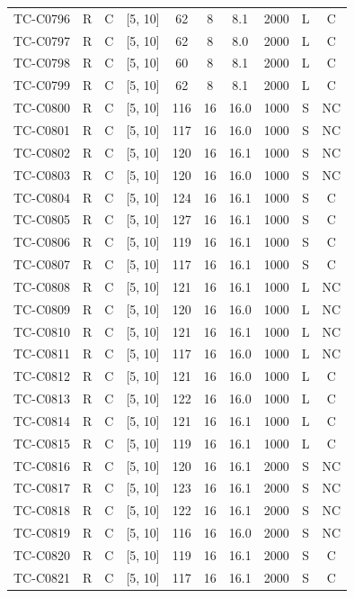 \begin{longtable}{lccccccccc}
TC-C0796 & R & C & [5, 10] & 62 & 8 & 8.1 & 2000 & L & C \\
TC-C0797 & R & C & [5, 10] & 62 & 8 & 8.0 & 2000 & L & C \\
TC-C0798 & R & C & [5, 10] & 60 & 8 & 8.1 & 2000 & L & C \\
TC-C0799 & R & C & [5, 10] & 62 & 8 & 8.1 & 2000 & L & C \\
TC-C0800 & R & C & [5, 10] & 116 & 16 & 16.0 & 1000 & S & NC \\
TC-C0801 & R & C & [5, 10] & 117 & 16 & 16.0 & 1000 & S & NC \\
TC-C0802 & R & C & [5, 10] & 120 & 16 & 16.1 & 1000 & S & NC \\
TC-C0803 & R & C & [5, 10] & 120 & 16 & 16.0 & 1000 & S & NC \\
TC-C0804 & R & C & [5, 10] & 124 & 16 & 16.1 & 1000 & S & C \\
TC-C0805 & R & C & [5, 10] & 127 & 16 & 16.1 & 1000 & S & C \\
TC-C0806 & R & C & [5, 10] & 119 & 16 & 16.1 & 1000 & S & C \\
TC-C0807 & R & C & [5, 10] & 117 & 16 & 16.1 & 1000 & S & C \\
TC-C0808 & R & C & [5, 10] & 121 & 16 & 16.1 & 1000 & L & NC \\
TC-C0809 & R & C & [5, 10] & 120 & 16 & 16.0 & 1000 & L & NC \\
TC-C0810 & R & C & [5, 10] & 121 & 16 & 16.1 & 1000 & L & NC \\
TC-C0811 & R & C & [5, 10] & 117 & 16 & 16.0 & 1000 & L & NC \\
TC-C0812 & R & C & [5, 10] & 121 & 16 & 16.0 & 1000 & L & C \\
TC-C0813 & R & C & [5, 10] & 122 & 16 & 16.0 & 1000 & L & C \\
TC-C0814 & R & C & [5, 10] & 121 & 16 & 16.1 & 1000 & L & C \\
TC-C0815 & R & C & [5, 10] & 119 & 16 & 16.1 & 1000 & L & C \\
TC-C0816 & R & C & [5, 10] & 120 & 16 & 16.1 & 2000 & S & NC \\
TC-C0817 & R & C & [5, 10] & 123 & 16 & 16.1 & 2000 & S & NC \\
TC-C0818 & R & C & [5, 10] & 122 & 16 & 16.1 & 2000 & S & NC \\
TC-C0819 & R & C & [5, 10] & 116 & 16 & 16.0 & 2000 & S & NC \\
TC-C0820 & R & C & [5, 10] & 119 & 16 & 16.1 & 2000 & S & C \\
TC-C0821 & R & C & [5, 10] & 117 & 16 & 16.1 & 2000 & S & C \\

\end{longtable}
